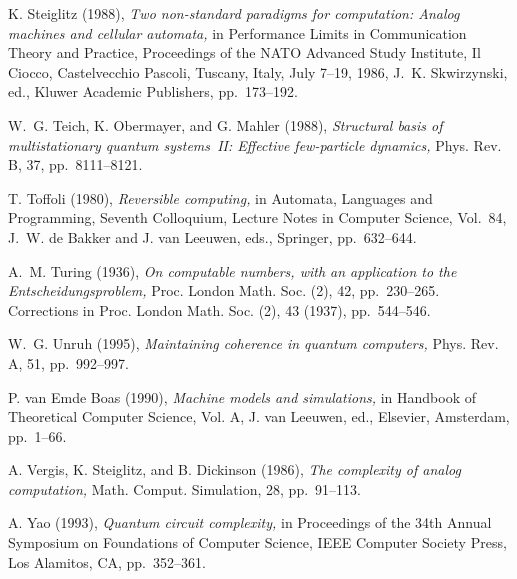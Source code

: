 {\begin{thebibliography}{}
  {\sc K. Steiglitz} (1988), {\em Two 
non-standard paradigms for computation{\rm :} Analog machines and 
cellular automata,} in {Performance Limits in Communication Theory and 
Practice,} Proceedings of the NATO Advanced Study Institute, Il Ciocco, 
Castelvecchio Pascoli, Tuscany, Italy, July 7--19, 1986,
J.~K. Skwirzynski, ed., Kluwer Academic Publishers, pp.~173--192.

 {\sc W.~G. Teich, K. Obermayer, and 
G. Mahler} (1988), {\em Structural basis of multistationary quantum 
systems~{\rm II:} Effective few-particle dynamics,} {Phys. Rev. B,} 
{37,} pp.~8111--8121.

 {\sc T. Toffoli} (1980), 
{\em Reversible computing,} in {Automata, Languages and Programming, 
Seventh Colloquium,} Lecture Notes in Computer Science, Vol.\ 84,
J.~W. de Bakker and J. van Leeuwen, eds., Springer, pp.~632--644.

  {\sc A.~M. Turing} (1936), 
{\em On computable numbers, with an application to the Entscheidungsproblem,}
{Proc. London Math. Soc. (2),} {42,} pp.~230--265. \newblock Corrections in 
{Proc. London Math. Soc. (2),} {43} (1937), pp.~544--546.

 {\sc W.~G. Unruh} (1995), {\em Maintaining 
coherence in quantum computers,} {Phys. Rev. A,} {51,} pp.~992--997.

  {\sc P. van Emde Boas} (1990), 
{\em Machine models and simulations,} in {Handbook of Theoretical Computer 
Science, Vol. A,} J. van Leeuwen, ed., Elsevier, Amsterdam, pp.~1--66.

  {\sc A. Vergis, K. Steiglitz, and
B. Dickinson} (1986), {\em The 
complexity of analog computation,} {Math. Comput. Simulation,} {28,} 
pp.~91--113.

  {\sc A. Yao} (1993), {\em Quantum circuit 
complexity,} in {Proceedings of the 34th Annual Symposium on Foundations 
of Computer Science,} IEEE Computer Society Press, Los Alamitos, CA, 
pp.~352--361. 

\end{thebibliography}
}



